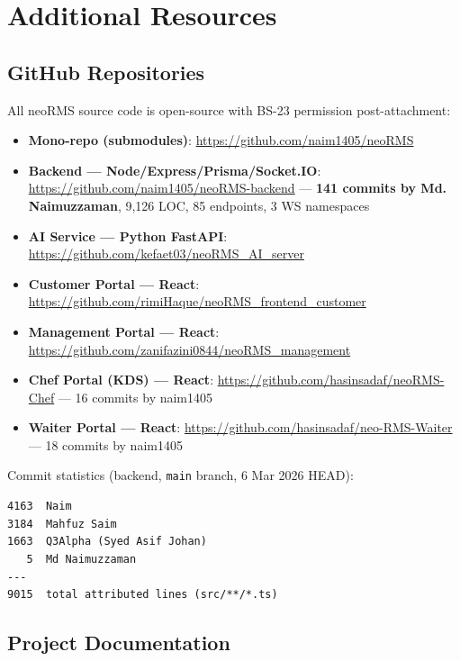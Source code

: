 \chapter{Additional Resources}
\label{app:resources}

\section{GitHub Repositories}
\label{app:github}

All neoRMS source code is open-source with BS-23 permission post-attachment:

\begin{itemize}
\item \textbf{Mono-repo (submodules)}: \url{https://github.com/naim1405/neoRMS}
\item \textbf{Backend --- Node/Express/Prisma/Socket.IO}: \url{https://github.com/naim1405/neoRMS-backend} --- \textbf{141 commits by Md. Naimuzzaman}, 9,126 LOC, 85 endpoints, 3 WS namespaces
\item \textbf{AI Service --- Python FastAPI}: \url{https://github.com/kefaet03/neoRMS_AI_server}
\item \textbf{Customer Portal --- React}: \url{https://github.com/rimiHaque/neoRMS_frontend_customer}
\item \textbf{Management Portal --- React}: \url{https://github.com/zanifazini0844/neoRMS_management}
\item \textbf{Chef Portal (KDS) --- React}: \url{https://github.com/hasinsadaf/neoRMS-Chef} --- 16 commits by naim1405
\item \textbf{Waiter Portal --- React}: \url{https://github.com/hasinsadaf/neo-RMS-Waiter} --- 18 commits by naim1405
\end{itemize}

Commit statistics (backend, \texttt{main} branch, 6 Mar 2026 HEAD):
\begin{verbatim}
4163  Naim
3184  Mahfuz Saim
1663  Q3Alpha (Syed Asif Johan)
   5  Md Naimuzzaman
---
9015  total attributed lines (src/**/*.ts)
\end{verbatim}

\section{Project Documentation}

